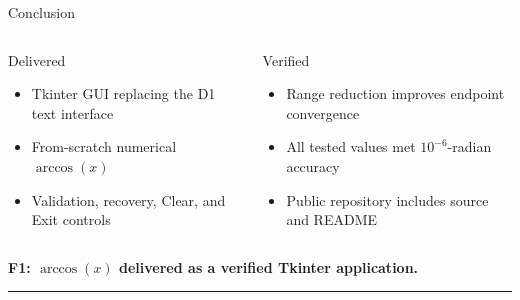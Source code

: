 \documentclass[aspectratio=169]{beamer}
\begin{document}
\begin{frame}{Conclusion}
\begin{columns}[T,onlytextwidth]

\begin{block}{Delivered}
\begin{itemize}
    \item Tkinter GUI replacing the D1 text interface
    \item From-scratch numerical \(\arccos(x)\)
    \item Validation, recovery, Clear, and Exit controls
\end{itemize}
\end{block}


\begin{exampleblock}{Verified}
\begin{itemize}
    \item Range reduction improves endpoint convergence
    \item All tested values met \(10^{-6}\)-radian accuracy
    \item Public repository includes source and README
\end{itemize}
\end{exampleblock}
\end{columns}

\vfill

\centering
{\color{navy}\Large\bfseries
F1: \(\arccos(x)\) delivered as a verified Tkinter application.\par}
\vspace{0.25cm}
{\color{blueaccent}\rule{0.72\textwidth}{1pt}\par}
\end{frame}
\end{document}
